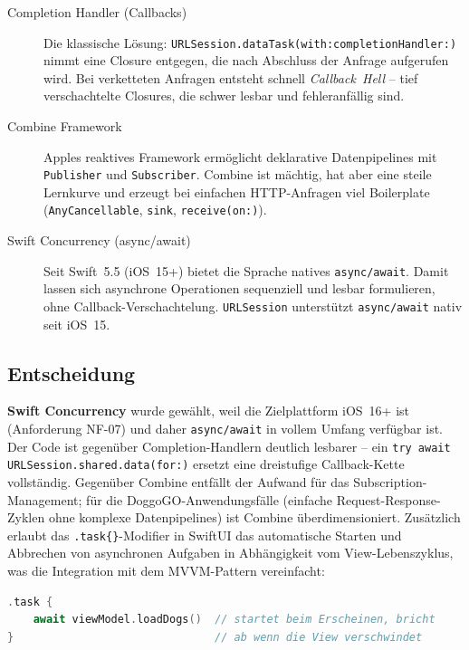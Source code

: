 \begin{description}
  \item[Completion Handler (Callbacks)]
    Die klassische Lösung: \texttt{URLSession.dataTask(with:completionHandler:)} nimmt
    eine Closure entgegen, die nach Abschluss der Anfrage aufgerufen wird. Bei
    verketteten Anfragen entsteht schnell \emph{Callback~Hell} – tief verschachtelte
    Closures, die schwer lesbar und fehleranfällig sind.
  \item[Combine Framework]
    Apples reaktives Framework ermöglicht deklarative Datenpipelines mit
    \texttt{Publisher} und \texttt{Subscriber}. Combine ist mächtig, hat aber eine
    steile Lernkurve und erzeugt bei einfachen HTTP-Anfragen viel Boilerplate
    (\texttt{AnyCancellable}, \texttt{sink}, \texttt{receive(on:)}).
  \item[Swift Concurrency (async/await)]
    Seit Swift~5.5 (iOS~15+) bietet die Sprache natives \texttt{async/await}. Damit
    lassen sich asynchrone Operationen sequenziell und lesbar formulieren, ohne
    Callback-Verschachtelung. \texttt{URLSession} unterstützt \texttt{async/await}
    nativ seit iOS~15.
\end{description}

\subsection{Entscheidung}
\label{subsec:concurrency-entscheidung}

\textbf{Swift Concurrency} wurde gewählt, weil die Zielplattform iOS~16+ ist (Anforderung
NF-07) und daher \texttt{async/await} in vollem Umfang verfügbar ist. Der Code ist
gegenüber Completion-Handlern deutlich lesbarer – ein \texttt{try await
URLSession.shared.data(for:)} ersetzt eine dreistufige Callback-Kette vollständig.
Gegenüber Combine entfällt der Aufwand für das Subscription-Management; für die
DoggoGO-Anwendungsfälle (einfache Request-Response-Zyklen ohne komplexe Datenpipelines)
ist Combine überdimensioniert. Zusätzlich erlaubt das \texttt{.task\{\}}-Modifier in
SwiftUI das automatische Starten und Abbrechen von asynchronen Aufgaben in Abhängigkeit
vom View-Lebenszyklus, was die Integration mit dem MVVM-Pattern vereinfacht:

\begin{lstlisting}[language=swift, caption={Swift Concurrency – .task\{\} in SwiftUI}, label=lst:task-modifier]
.task {
    await viewModel.loadDogs()  // startet beim Erscheinen, bricht
}                               // ab wenn die View verschwindet
\end{lstlisting}

